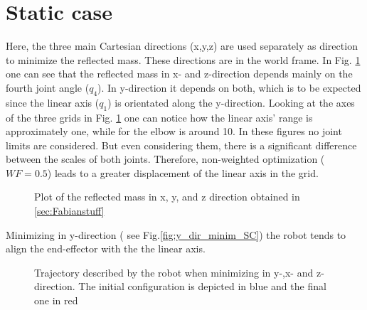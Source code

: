 \section{Static case} 
\label{sec:static_case}






Here, the three main Cartesian directions (x,y,z) are used separately as direction to minimize the reflected mass. These directions are in the world frame. In Fig. \ref{fig:reflected_mass_cart_directions}  one can see that the reflected mass in x- and z-direction depends mainly on the fourth joint angle ($q_4$). In y-direction it depends on both, which is to be expected since the linear axis ($q_1$) is orientated along the y-direction. Looking at the axes of the three grids in Fig. \ref{fig:reflected_mass_cart_directions} one can notice how the linear axis' range is approximately one, while for the elbow is around 10. In these figures no joint limits are considered. But even considering them, there is a significant difference between the scales of both joints. Therefore, non-weighted  optimization ($WF = 0.5$) leads to a greater displacement of the linear axis in the grid.
%
\begin{figure}[htp!]
	\centering	
	 	 	
	\caption{Plot of the reflected mass in x, y, and z direction obtained in \ref{sec:Fabianstuff}}
	\label{fig:reflected_mass_cart_directions}
\end{figure}
%
%
Minimizing in y-direction ( see Fig.\ref{fig:y_dir_minim_SC}) the robot tends to align the end-effector with the the linear axis.
\begin{figure}[htp!]
	\centering	
	 	 	
	\caption{Trajectory described by the robot when minimizing in y-,x- and z-direction. The initial configuration is depicted in blue and the final one in red}
	\label{fig:dir_minim_SC}
\end{figure}
